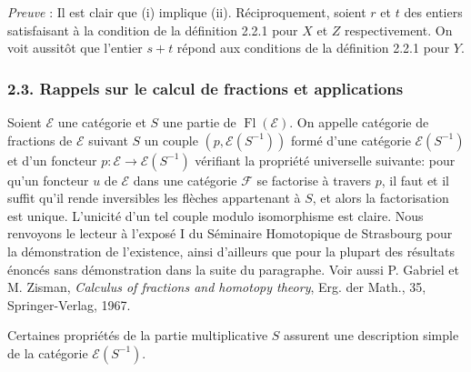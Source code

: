 \documentclass[11pt]{article}
\providecommand{\Fl}{\operatorname{Fl}}
\providecommand{\cE}{\mathcal E}
\providecommand{\cF}{\mathcal F}
\begin{document}
\emph{Preuve} : Il est clair que (i) implique (ii). Réciproquement, soient $r$ et $t$ des entiers satisfaisant à la condition de la définition 2.2.1 pour $X$ et $Z$ respectivement. On voit aussitôt que l'entier $s+t$ répond aux conditions de la définition 2.2.1 pour $Y$.

\subsubsection*{2.3. Rappels sur le calcul de fractions et applications}
Soient $\cE$ une catégorie et $S$ une partie de $\Fl(\cE)$. On appelle catégorie de fractions de $\cE$ suivant $S$ un couple $(p,\cE(S^{-1}))$ formé d'une catégorie $\cE(S^{-1})$ et d'un foncteur $p:\cE\to\cE(S^{-1})$ vérifiant la propriété universelle suivante: pour qu'un foncteur $u$ de $\cE$ dans une catégorie $\cF$ se factorise à travers $p$, il faut et il suffit qu'il rende inversibles les flèches appartenant à $S$, et alors la factorisation est unique. L'unicité d'un tel couple modulo isomorphisme est claire. Nous renvoyons le lecteur à l'exposé I du Séminaire Homotopique de Strasbourg pour la démonstration de l'existence, ainsi d'ailleurs que pour la plupart des résultats énoncés sans démonstration dans la suite du paragraphe. Voir aussi P. Gabriel et M. Zisman, \emph{Calculus of fractions and homotopy theory}, Erg. der Math., 35, Springer-Verlag, 1967.

Certaines propriétés de la partie multiplicative $S$ assurent une description simple de la catégorie $\cE(S^{-1})$.
\end{document}
